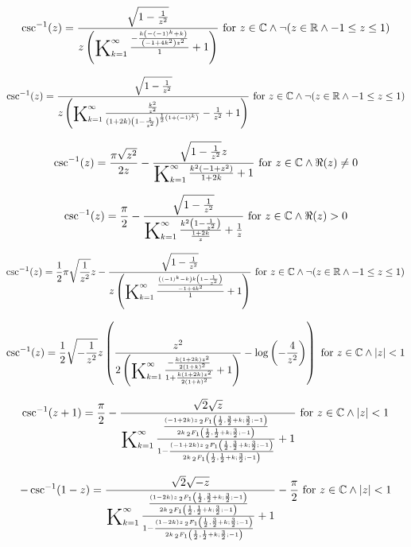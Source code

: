 \documentclass{article}
\newcommand{\bigK}{\mathop{\raisebox{-5pt}{\huge K}}}
\begin{document}
\[\csc ^{-1}(z)=\frac{\sqrt{1-\frac{1}{z^2}}}{z \left(\bigK_{k=1}^{\infty}\frac{-\frac{k \left(-(-1)^k+k\right)}{\left(-1+4 k^2\right) z^2}}{1}+1\right)}\text{ for }z\in \mathbb{C}\land \neg (z\in \mathbb{R}\land -1\leq z\leq 1)\] 

\[\csc ^{-1}(z)=\frac{\sqrt{1-\frac{1}{z^2}}}{z \left(\bigK_{k=1}^{\infty}\frac{\frac{k^2}{z^2}}{(1+2 k) \left(1-\frac{1}{z^2}\right)^{\frac{1}{2} \left(1+(-1)^k\right)}}-\frac{1}{z^2}+1\right)}\text{ for }z\in \mathbb{C}\land \neg (z\in \mathbb{R}\land -1\leq z\leq 1)\] 

\[\csc ^{-1}(z)=\frac{\pi  \sqrt{z^2}}{2 z}-\frac{\sqrt{1-\frac{1}{z^2}} z}{\bigK_{k=1}^{\infty}\frac{k^2 \left(-1+z^2\right)}{1+2 k}+1}\text{ for }z\in \mathbb{C}\land \Re(z)\neq 0\] 

\[\csc ^{-1}(z)=\frac{\pi }{2}-\frac{\sqrt{1-\frac{1}{z^2}}}{\bigK_{k=1}^{\infty}\frac{k^2 \left(1-\frac{1}{z^2}\right)}{\frac{1+2 k}{z}}+\frac{1}{z}}\text{ for }z\in \mathbb{C}\land \Re(z)>0\] 

\[\csc ^{-1}(z)=\frac{1}{2} \pi  \sqrt{\frac{1}{z^2}} z-\frac{\sqrt{1-\frac{1}{z^2}}}{z \left(\bigK_{k=1}^{\infty}\frac{\frac{\left((-1)^k-k\right) k \left(1-\frac{1}{z^2}\right)}{-1+4 k^2}}{1}+1\right)}\text{ for }z\in \mathbb{C}\land \neg (z\in \mathbb{R}\land -1\leq z\leq 1)\] 

\[\csc ^{-1}(z)=\frac{1}{2} \sqrt{-\frac{1}{z^2}} z \left(\frac{z^2}{2 \left(\bigK_{k=1}^{\infty}\frac{-\frac{k (1+2 k) z^2}{2 (1+k)^2}}{1+\frac{k (1+2 k) z^2}{2 (1+k)^2}}+1\right)}-\log \left(-\frac{4}{z^2}\right)\right)\text{ for }z\in \mathbb{C}\land \left| z\right| <1\] 

\[\csc ^{-1}(z+1)=\frac{\pi }{2}-\frac{\sqrt{2} \sqrt{z}}{\bigK_{k=1}^{\infty}\frac{\frac{(-1+2 k) z \, _2F_1\left(\frac{1}{2},\frac{3}{2}+k;\frac{3}{2};-1\right)}{2 k \, _2F_1\left(\frac{1}{2},\frac{1}{2}+k;\frac{3}{2};-1\right)}}{1-\frac{(-1+2 k) z \, _2F_1\left(\frac{1}{2},\frac{3}{2}+k;\frac{3}{2};-1\right)}{2 k \, _2F_1\left(\frac{1}{2},\frac{1}{2}+k;\frac{3}{2};-1\right)}}+1}\text{ for }z\in \mathbb{C}\land \left| z\right| <1\] 

\[-\csc ^{-1}(1-z)=\frac{\sqrt{2} \sqrt{-z}}{\bigK_{k=1}^{\infty}\frac{\frac{(1-2 k) z \, _2F_1\left(\frac{1}{2},\frac{3}{2}+k;\frac{3}{2};-1\right)}{2 k \, _2F_1\left(\frac{1}{2},\frac{1}{2}+k;\frac{3}{2};-1\right)}}{1-\frac{(1-2 k) z \, _2F_1\left(\frac{1}{2},\frac{3}{2}+k;\frac{3}{2};-1\right)}{2 k \, _2F_1\left(\frac{1}{2},\frac{1}{2}+k;\frac{3}{2};-1\right)}}+1}-\frac{\pi }{2}\text{ for }z\in \mathbb{C}\land \left| z\right| <1\] 
\end{document}
